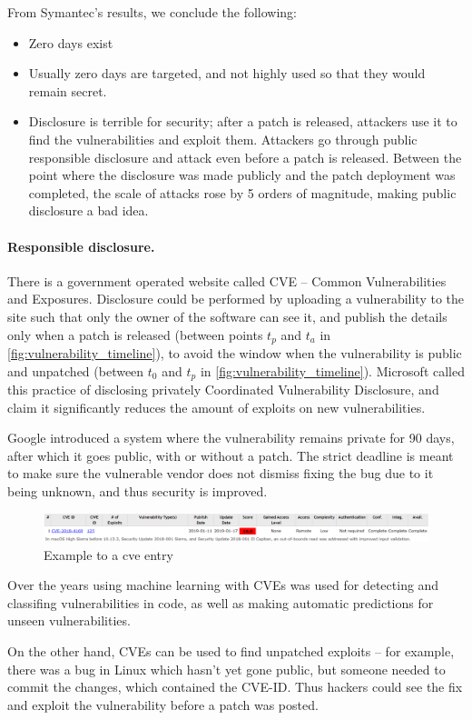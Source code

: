 From Symantec's results, we conclude the following:

\begin{itemize}
    \item Zero days exist
    \item Usually zero days are targeted, and not highly used so that they would
    remain secret.
    \item Disclosure is terrible for security; after a patch is released,
    attackers use it to find the vulnerabilities and exploit them. Attackers go
    through public responsible disclosure and attack even before a patch is
    released. Between the point where the disclosure was made publicly and the
    patch deployment was completed, the scale of attacks rose by 5 orders of
    magnitude, making public disclosure a bad idea.
\end{itemize}

\paragraph{Responsible disclosure.} There is a government operated website
called CVE – Common Vulnerabilities and Exposures. Disclosure could be performed
by uploading a vulnerability to the site such that only the owner of the
software can see it, and publish the details only when a patch is released
(between points $t_p$ and $t_a$ in \cref{fig:vulnerability_timeline}), to avoid
the window when the vulnerability is public and unpatched (between $t_0$ and
$t_p$ in \cref{fig:vulnerability_timeline}). Microsoft called this practice of
disclosing privately Coordinated Vulnerability Disclosure, and claim it
significantly reduces the amount of exploits on new vulnerabilities\cite{CVD}.

Google introduced a system\cite{googleDisclosure} where the vulnerability remains private for 90 days,
after which it goes public, with or without a patch. The strict deadline is
meant to make sure the vulnerable vendor does not dismiss fixing the bug due to
it being unknown, and thus security is improved.

\begin{figure}[!ht]
    \centering
    \includegraphics[width=\textwidth]{images/chapter10/macOScve2.png}
    \caption{Example to a cve entry} \label{fig:macOSsve}
\end{figure}

Over the years using machine learning with CVEs was used for detecting and classifing vulnerabilities in code\cite{mokhov2010use}, 
as well as making automatic predictions for unseen vulnerabilities\cite{edkrantz2015predicting}.

On the other hand, CVEs can be used to find unpatched exploits – for example, there was a bug in Linux
which hasn't yet gone public, but someone needed to commit the changes, which
contained the CVE-ID. Thus hackers could see the fix and exploit the
vulnerability before a patch was posted.
